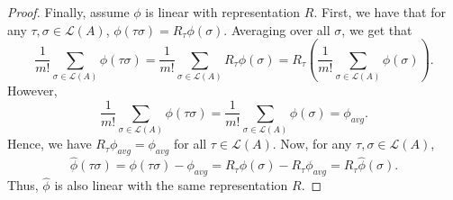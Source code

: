 \documentclass[10pt,letterpaper]{article}
\newcommand{\calL}{{\mathcal{L}}}
\newcommand{\rank}{{\calL(A)}}
\DeclareMathOperator*{\argmin}{arg\,min}
\begin{document}
\begin{proof}
Finally, assume $\phi$ is linear with representation $R$. First, we have that for any $\tau,\sigma \in \rank$, $\phi(\tau \sigma) = R_{\tau}\phi(\sigma)$. Averaging over all $\sigma$, we get that 
$$
\frac{1}{m!} \sum_{\sigma \in \rank} \phi(\tau \sigma) = \frac{1}{m!}  \sum_{\sigma \in \rank} R_{\tau} \phi(\sigma) = R_{\tau} \left (\frac{1}{m!}  \sum_{\sigma \in \rank} \phi(\sigma) \right).
$$
However, 
$$
\frac{1}{m!}  \sum_{\sigma \in \rank} \phi(\tau \sigma) = \frac{1}{m!}  \sum_{\sigma \in \rank} \phi(\sigma) = \phi_{avg}.
$$
Hence, we have $R_{\tau}\phi_{avg} = \phi_{avg}$ for all $\tau \in \rank$. Now, for any $\tau,\sigma \in \rank$, 
$$
\hat{\phi}(\tau \sigma) = \phi(\tau \sigma) - \phi_{avg} = R_{\tau}\phi(\sigma) - R_{\tau}\phi_{avg} = R_{\tau}\hat{\phi}(\sigma).
$$
Thus, $\hat{\phi}$ is also linear with the same representation $R$.
%
%
\end{proof}
\end{document}
